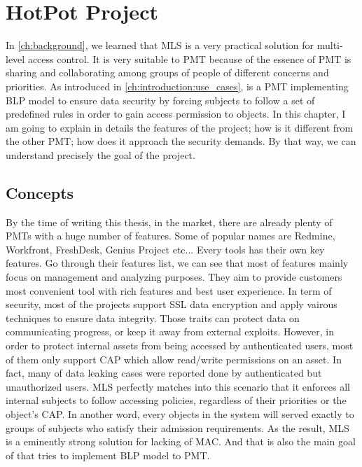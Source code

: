 ﻿%

\chapter{HotPot Project} %

\label{ch:hopot_project} %


In \autoref{ch:background}, we learned that MLS is a very practical solution for multi-level access control.
It is very suitable to PMT because of the essence of PMT is sharing and collaborating among groups of people of different concerns and priorities.
As introduced in \autoref{ch:introduction:use_cases}, \myProject is a PMT implementing BLP model to ensure data security by forcing subjects to follow a set of predefined rules in order to gain access permission to objects.
In this chapter, I am going to explain in details the features of the project; how is it different from the other PMT; how does it approach the security demands.
By that way, we can understand precisely the goal of the project.


\section{Concepts}
\label{ch:hopot_project:concepts}

By the time of writing this thesis, in the market, there are already plenty of PMTs with a huge number of features.
Some of popular names are Redmine, Workfront, FreshDesk, Genius Project etc...
Every tools has their own key features.
Go through their features list, we can see that most of features mainly focus on management and analyzing purposes.
They aim to provide customers most convenient tool with rich features and best user experience.
In term of security, most of the projects support SSL data encryption and apply vairous techniques to ensure data integrity.
Those traits can protect data on communicating progress, or keep it away from external exploits.
However, in order to protect internal assets from being accessed by authenticated users, most of them only support CAP which allow read/write permissions on an asset.
In fact, many of data leaking cases were reported done by authenticated but unauthorized users.
MLS perfectly matches into this scenario that it enforces all internal subjects to follow accessing policies, regardless of their priorities or the object's CAP.
In another word, every objects in the system will served exactly to groups of subjects who satisfy their admission requirements.
As the result, MLS is a eminently strong solution for lacking of MAC.
And that is also the main goal of \myProject that tries to implement BLP model to PMT.

